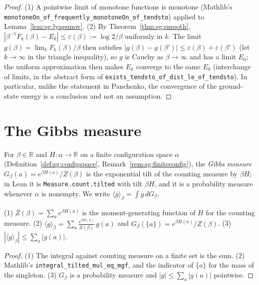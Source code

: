 \begin{proof}
  \leanok
(1) A pointwise limit of monotone functions is monotone (Mathlib's
\texttt{monotoneOn\_of\_frequently\_monotoneOn\_of\_tendsto}) applied to Lemma~\ref{lem:sg:lyapunov}.
(2) By Theorem~\ref{thm:sg:smooth}, $|\beta^{-1}F_k(\beta)-E_k|\le\varepsilon(\beta):=\log2/\beta$ uniformly in $k$. The
limit $g(\beta)=\lim_kF_k(\beta)/\beta$ then satisfies $|g(\beta)-g(\beta')|\le\varepsilon(\beta)+\varepsilon(\beta')$ (let
$k\to\infty$ in the triangle inequality), so $g$ is Cauchy as $\beta\to\infty$ and has a limit $E_0$; the uniform
approximation then makes $E_k$ converge to the same $E_0$ (interchange of limits, in the abstract form of
\texttt{exists\_tendsto\_of\_dist\_le\_of\_tendsto}). In particular, unlike the statement in Panchenko, the
convergence of the ground-state energy is a conclusion and not an assumption.
\end{proof}

\section{The Gibbs measure}\label{sec:sg:gibbs}

For $\beta\in\mathbb R$ and $H:\alpha\to\mathbb R$ on a finite configuration space $\alpha$ (Definition~\ref{def:sg:configspace}, Remark~\ref{rem:sg:finiteconfig}), the \emph{Gibbs measure}
$G_\beta(a)=e^{\beta H(a)}/Z(\beta)$ is the exponential tilt of the counting measure by $\beta H$; in Lean it is
\texttt{Measure.count.tilted} with tilt $\beta H$, and it is a probability measure whenever $\alpha$ is nonempty. We write
$\langle g\rangle_\beta=\int g\,dG_\beta$.

\begin{lemma}\label{lem:sg:gibbsavg}
  \leanok
(1) $Z(\beta)=\sum_ae^{\beta H(a)}$ is the moment-generating function of $H$ for the counting measure.
(2) $\langle g\rangle_\beta=\sum_a\frac{e^{\beta H(a)}}{Z(\beta)}\,g(a)$ and $G_\beta(\{a\})=e^{\beta H(a)}/Z(\beta)$.
(3) $|\langle g\rangle_\beta|\le\sum_a|g(a)|$.
\end{lemma}

\begin{proof}
  \leanok
(1) The integral against counting measure on a finite set is the sum. (2) Mathlib's
\texttt{integral\_tilted\_mul\_eq\_mgf}, and the indicator of $\{a\}$ for the mass of the singleton.
(3) $G_\beta$ is a probability measure and $|g|\le\sum_a|g(a)|$ pointwise.
\end{proof}

